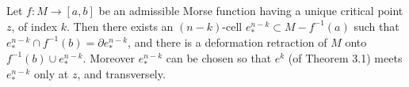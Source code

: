 Let $f: M \rightarrow [a,b]$ be an admissible Morse function having a unique critical point $z$, of index $k$. Then there exists an $(n-k)$-cell $e_*^{n-k} \subset M - f^{-1}(a)$ such that $e_*^{n-k} \cap f^{-1}(b) = \partial e_*^{n-k}$, and there is a deformation retraction of $M$ onto $f^{-1}(b) \cup e_*^{n-k}$. Moreover $e_*^{n-k}$ can be chosen so that $e^k$ (of Theorem 3.1) meets $e_*^{n-k}$ only at $z$, and transversely.
